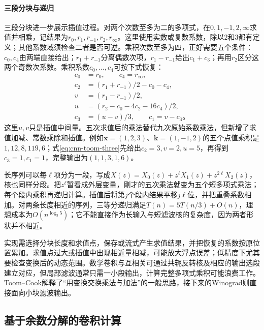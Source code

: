 \paragraph{三段分块与递归}

三段分块进一步展示插值过程。对两个次数至多为二的多项式，在$0,1,-1,2,\infty$求值并相乘，记结果为$r_0,r_1,r_{-1},r_2,r_\infty$。这里使用实数或复数系数，除以$2$和$3$都有定义；其他系数域须检查二者是否可逆。乘积次数至多为四，正好需要五个条件：$c_0,c_4$由两端直接给出；$r_1+r_{-1}$分离偶数次项，$r_1-r_{-1}$给出$c_1+c_3$；再用$r_2$区分这两个奇数次系数。乘积系数$c_0,\ldots,c_4$可按下式恢复：
\begin{equation}
  \begin{aligned}
    c_0&=r_0,\qquad c_4=r_\infty,\\
    c_2&=(r_1+r_{-1})/2-c_0-c_4,\\
    v&=(r_1-r_{-1})/2,\\
    u&=(r_2-c_0-4c_2-16c_4)/2,\\
    c_3&=(u-v)/3,\qquad c_1=v-c_3\text{。}
  \end{aligned}
  \label{eq:cnn-toom-three}
\end{equation}
这里$u,v$只是插值中间量。五次求值后的乘法替代九次原始系数乘法，但新增了求值加减、常数乘除和插值。例如$\bm x=(1,2,3)$、$\bm k=(1,-1,2)$的五个点值乘积是$1,12,8,119,6$；式\eqref{eq:cnn-toom-three}先给出$c_2=3,v=2,u=5$，再得到$c_3=1,c_1=1$，完整输出为$(1,1,3,1,6)$。

长序列可以每$\ell$项分为一段，写成$X(z)=X_0(z)+z^\ell X_1(z)+z^{2\ell}X_2(z)$，核也同样分段。把$z^\ell$暂看成外层变量，刚才的五次乘法就变为五个短多项式乘法；每个段内乘积再递归计算。插值后将第$j$个段内结果平移$j\ell$位，并把重叠系数相加。对两条长度相近的序列，三等分递归满足$T(n)=5T(n/3)+O(n)$，理想成本为$O(n^{\log_3 5})$；它不能直接作为长输入与短滤波核的复杂度，因为两者形状并不相近。

实现需选择分块长度和求值点，保存或流式产生求值结果，并把恢复的系数按原位置累加。求值点过大或插值中出现相近量相减，可能放大浮点误差；低精度下尤其要检查变换后的动态范围。数学卷积与互相关可通过共轭反转核及相应的输出选段建立对应，但局部滤波通常只需一小段输出，计算完整多项式乘积可能浪费工作。Toom--Cook解释了“用变换交换乘法与加法”的一般思路，接下来的Winograd则直接面向小块滤波输出。

\subsection{基于余数分解的卷积计算}\label{sec:signal-analysis-fast-winograd}\label{sec:cnn-winograd}

